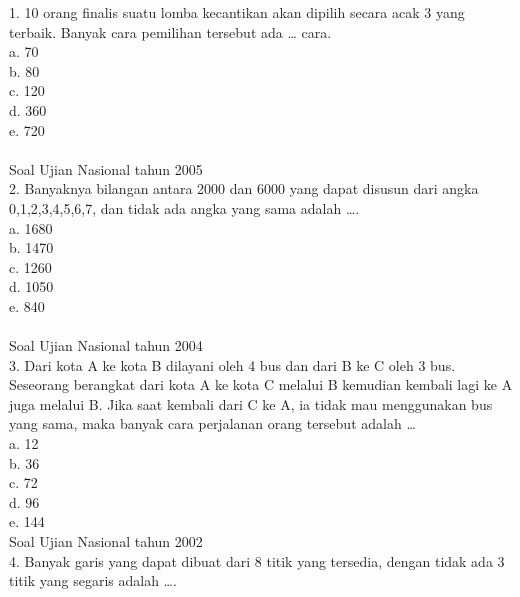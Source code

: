 \documentclass[11pt,fleqn]{book} %
\begin{document}
1. 10 orang finalis suatu lomba kecantikan akan dipilih secara acak 3 yang terbaik. Banyak cara pemilihan tersebut ada … cara.\\

a.	70\\

b.	80\\

c.	120\\

d.	360\\

e.	720\\
\\

Soal Ujian Nasional tahun 2005\\
2. Banyaknya bilangan antara 2000 dan 6000 yang dapat disusun dari angka 0,1,2,3,4,5,6,7, dan tidak ada angka yang sama adalah ….\\

a. 1680\\

b. 1470\\

c. 1260\\

d. 1050\\

e. 840\\
\\

Soal Ujian Nasional tahun 2004\\
3. Dari kota A ke kota B dilayani oleh 4 bus dan dari B ke C oleh 3 bus. Seseorang berangkat dari kota A ke kota C melalui B kemudian kembali lagi ke A juga melalui B. Jika saat kembali dari C ke A, ia tidak mau menggunakan bus yang sama, maka banyak cara perjalanan orang tersebut adalah …\\

a. 12\\

b. 36\\

c. 72\\

d. 96\\

e. 144\\

Soal Ujian Nasional tahun 2002\\
4. Banyak garis yang dapat dibuat dari 8 titik yang tersedia, dengan tidak ada 3 titik yang segaris adalah ….\\
\end{document}
